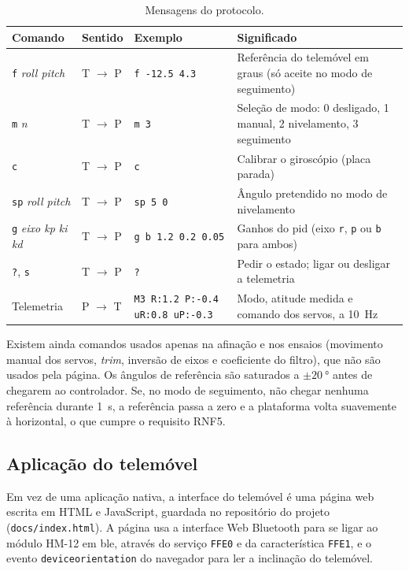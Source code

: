 \begin{table}[H]
\centering\small
\caption{Mensagens do protocolo.}
\begin{tabularx}{\textwidth}{>{\raggedright\arraybackslash}p{2.3cm}p{1.2cm}>{\raggedright\arraybackslash}p{3.3cm}Y}
\toprule
Comando & Sentido & Exemplo & Significado\\\midrule
\texttt{f} \textit{roll pitch} & T $\rightarrow$ P & \texttt{f -12.5 4.3} & Referência do telemóvel em graus (só aceite no modo de seguimento)\\
\texttt{m} \textit{n} & T $\rightarrow$ P & \texttt{m 3} & Seleção de modo: 0 desligado, 1 manual, 2 nivelamento, 3 seguimento\\
\texttt{c} & T $\rightarrow$ P & \texttt{c} & Calibrar o giroscópio (placa parada)\\
\texttt{sp} \textit{roll pitch} & T $\rightarrow$ P & \texttt{sp 5 0} & Ângulo pretendido no modo de nivelamento\\
\texttt{g} \textit{eixo kp ki kd} & T $\rightarrow$ P & \texttt{g b 1.2 0.2 0.05} & Ganhos do \gls{pid} (eixo \texttt{r}, \texttt{p} ou \texttt{b} para ambos)\\
\texttt{?}, \texttt{s} & T $\rightarrow$ P & \texttt{?} & Pedir o estado; ligar ou desligar a telemetria\\
Telemetria & P $\rightarrow$ T & \texttt{M3 R:1.2 P:-0.4 uR:0.8 uP:-0.3} & Modo, atitude medida e comando dos servos, a \SI{10}{\hertz}\\
\bottomrule
\end{tabularx}
\label{tab:protocolo}
\end{table}

Existem ainda comandos usados apenas na afinação e nos ensaios (movimento manual dos servos, \textit{trim}, inversão de eixos e coeficiente do filtro), que não são usados pela página. Os ângulos de referência são saturados a $\pm\SI{20}{\degree}$ antes de chegarem ao controlador. Se, no modo de seguimento, não chegar nenhuma referência durante \SI{1}{\second}, a referência passa a zero e a plataforma volta suavemente à horizontal, o que cumpre o requisito RNF5.

\subsection{Aplicação do telemóvel}
Em vez de uma aplicação nativa, a interface do telemóvel é uma página web escrita em HTML e JavaScript, guardada no repositório do projeto (\texttt{docs/index.html}). A página usa a interface Web Bluetooth para se ligar ao módulo HM-12 em \gls{ble}, através do serviço \texttt{FFE0} e da característica \texttt{FFE1}, e o evento \texttt{deviceorientation} do navegador para ler a inclinação do telemóvel.

